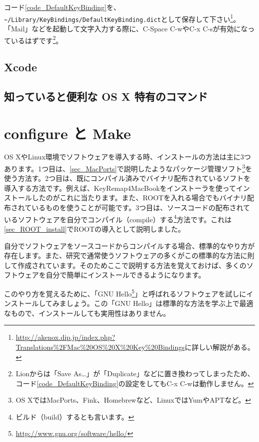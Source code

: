 コード\ref{code_DefaultKeyBinding}を、\texttt{\~{}/Library/KeyBindings/DefaultKeyBinding.dict}として保存して下さい\footnote{\url{http://akenox.dip.jp/index.php?Translations\%2FMac\%20OS\%20X\%20Key\%20Bindings}に詳しい解説がある。}。「Mail」などを起動して文字入力する際に、C-Space C-wやC-x C-sが有効になっているはずです\footnote{Lionからは「Save As\ldots」が「Duplicate」などに置き換わってしまったため、コード\ref{code_DefaultKeyBinding}の設定をしてもC-x C-wは動作しません。}。



\section{Xcode}

\section{知っていると便利な OS X 特有のコマンド}

\chapter{configure と Make}

OS XやLinux環境でソフトウェアを導入する時、インストールの方法は主に3つあります。1つ目は、\ref{sec_MacPorts}で説明したようなパッケージ管理ソフト\footnote{OS XではMacPorts、Fink、Homebrewなど、LinuxではYumやAPTなど。}を使う方法す。2つ目は、既にコンパイル済みでバイナリ配布されているソフトを導入する方法です。例えば、KeyRemap4MacBookをインストーラを使ってインストールしたのがこれに当たります。また、ROOTを入れる場合でもバイナリ配布されているものを使うことが可能です。3つ目は、ソースコードの配布されているソフトウェアを自分でコンパイル（compile）する\footnote{ビルド（build）するとも言います。}方法です。これは\ref{sec_ROOT_install}でROOTの導入として説明しました。

自分でソフトウェアをソースコードからコンパイルする場合、標準的なやり方が存在します。また、研究で通常使うソフトウェアの多くがこの標準的な方法に則して作成されています。そのためここで説明する方法を覚えておけば、多くのソフトウェアを自分で簡単にインストールできるようになります。

このやり方を覚えるために、「GNU Hello\footnote{\url{http://www.gnu.org/software/hello/}}」と呼ばれるソフトウェアを試しにインストールしてみましょう。この「GNU Hello」は標準的な方法を学ぶ上で最適なもので、インストールしても実用性はありません。

